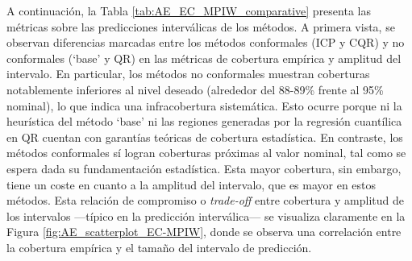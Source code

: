 A continuación, la Tabla \ref{tab:AE_EC_MPIW_comparative} presenta las métricas sobre las predicciones interválicas de los métodos. A primera vista, se observan diferencias marcadas entre los métodos conformales (ICP y CQR) y no conformales (`base' y QR)  en las métricas de cobertura empírica y amplitud del intervalo. En particular, los métodos no conformales  muestran coberturas notablemente inferiores al nivel deseado (alrededor del 88-89\% frente al 95\% nominal), lo que indica una infracobertura sistemática. Esto ocurre porque ni la heurística del método `base' ni las regiones generadas por la regresión cuantílica en QR cuentan con garantías teóricas de cobertura estadística.
En contraste, los métodos conformales sí logran coberturas próximas al valor nominal, tal como se espera dada su fundamentación estadística. Esta mayor cobertura, sin embargo, tiene un coste en cuanto a la amplitud del intervalo, que es mayor en estos métodos. Esta relación de compromiso o \textit{trade-off} entre cobertura y amplitud de los intervalos ---típico en la predicción interválica--- se visualiza claramente en la Figura \ref{fig:AE_scatterplot_EC-MPIW}, donde se observa una correlación entre la cobertura empírica y el tamaño del intervalo de predicción.

